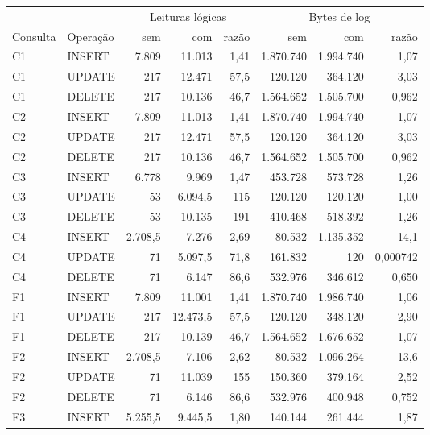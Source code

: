 {\small\setlength{\tabcolsep}{4pt}
\begin{tabular}{llrrrrrr}
\toprule
 &  & \multicolumn{3}{c}{Leituras lógicas} & \multicolumn{3}{c}{Bytes de log} \\
\cmidrule(lr){3-5}\cmidrule(lr){6-8}
Consulta & Operação & sem & com & razão & sem & com & razão \\
\midrule
C1 & INSERT & 7.809 & 11.013 & 1,41 & 1.870.740 & 1.994.740 & 1,07 \\
C1 & UPDATE & 217 & 12.471 & 57,5 & 120.120 & 364.120 & 3,03 \\
C1 & DELETE & 217 & 10.136 & 46,7 & 1.564.652 & 1.505.700 & 0,962 \\
C2 & INSERT & 7.809 & 11.013 & 1,41 & 1.870.740 & 1.994.740 & 1,07 \\
C2 & UPDATE & 217 & 12.471 & 57,5 & 120.120 & 364.120 & 3,03 \\
C2 & DELETE & 217 & 10.136 & 46,7 & 1.564.652 & 1.505.700 & 0,962 \\
C3 & INSERT & 6.778 & 9.969 & 1,47 & 453.728 & 573.728 & 1,26 \\
C3 & UPDATE & 53 & 6.094,5 & 115 & 120.120 & 120.120 & 1,00 \\
C3 & DELETE & 53 & 10.135 & 191 & 410.468 & 518.392 & 1,26 \\
C4 & INSERT & 2.708,5 & 7.276 & 2,69 & 80.532 & 1.135.352 & 14,1 \\
C4 & UPDATE & 71 & 5.097,5 & 71,8 & 161.832 & 120 & 0,000742 \\
C4 & DELETE & 71 & 6.147 & 86,6 & 532.976 & 346.612 & 0,650 \\
F1 & INSERT & 7.809 & 11.001 & 1,41 & 1.870.740 & 1.986.740 & 1,06 \\
F1 & UPDATE & 217 & 12.473,5 & 57,5 & 120.120 & 348.120 & 2,90 \\
F1 & DELETE & 217 & 10.139 & 46,7 & 1.564.652 & 1.676.652 & 1,07 \\
F2 & INSERT & 2.708,5 & 7.106 & 2,62 & 80.532 & 1.096.264 & 13,6 \\
F2 & UPDATE & 71 & 11.039 & 155 & 150.360 & 379.164 & 2,52 \\
F2 & DELETE & 71 & 6.146 & 86,6 & 532.976 & 400.948 & 0,752 \\
F3 & INSERT & 5.255,5 & 9.445,5 & 1,80 & 140.144 & 261.444 & 1,87 \\

\end{tabular}}

